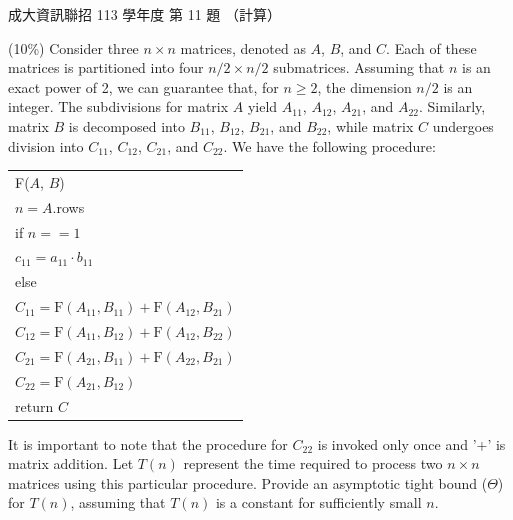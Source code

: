 \begin{pastexam}[label={px:ncku-113-prog-11}]{成大資訊聯招 113 學年度 第 11 題}
（計算）

(10\%) Consider three $n\times n$ matrices, denoted as $A$, $B$, and $C$. Each of these
matrices is partitioned into four $n/2\times n/2$ submatrices. Assuming that $n$ is an exact
power of 2, we can guarantee that, for $n\ge 2$, the dimension $n/2$ is an integer. The
subdivisions for matrix $A$ yield $A_{11}$, $A_{12}$, $A_{21}$, and $A_{22}$. Similarly,
matrix $B$ is decomposed into $B_{11}$, $B_{12}$, $B_{21}$, and $B_{22}$, while matrix $C$
undergoes division into $C_{11}$, $C_{12}$, $C_{21}$, and $C_{22}$. We have the following
procedure:
\par\vspace{1ex}
{\centering
\begin{tabular}{|l|}
\hline
F($A$, $B$)\\
\hspace*{2em}$n=A$.rows\\
\hspace*{2em}if $n==1$\\
\hspace*{4em}$c_{11}=a_{11}\cdot b_{11}$\\
\hspace*{2em}else\\
\hspace*{4em}$C_{11}=\mathrm{F}(A_{11},B_{11})+\mathrm{F}(A_{12},B_{21})$\\
\hspace*{4em}$C_{12}=\mathrm{F}(A_{11},B_{12})+\mathrm{F}(A_{12},B_{22})$\\
\hspace*{4em}$C_{21}=\mathrm{F}(A_{21},B_{11})+\mathrm{F}(A_{22},B_{21})$\\
\hspace*{4em}$C_{22}=\mathrm{F}(A_{21},B_{12})$\\
\hspace*{2em}return $C$\\
\hline
\end{tabular}\par}
\vspace{1ex}
It is important to note that the procedure for $C_{22}$ is invoked only once and '+' is
matrix addition. Let $T(n)$ represent the time required to process two $n\times n$ matrices
using this particular procedure. Provide an asymptotic tight bound ($\Theta$) for $T(n)$,
assuming that $T(n)$ is a constant for sufficiently small $n$.
\end{pastexam}

